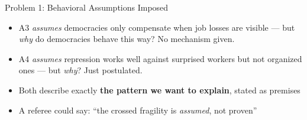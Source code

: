 \documentclass[
  ignorenonframetext,
  aspectratio=169]{beamer}
\begin{document}
\begin{frame}{Problem 1: Behavioral Assumptions Imposed}
\protect{}\label{problem-1-behavioral-assumptions-imposed}
\begin{center}
\end{center}

\vspace{0.4cm}

\begin{itemize}
  \item A3 \emph{assumes} democracies only compensate when job losses are visible --- but \emph{why} do democracies behave this way? No mechanism given.
  \item A4 \emph{assumes} repression works well against surprised workers but not organized ones --- but \emph{why}? Just postulated.
  \item Both describe exactly \textbf{the pattern we want to explain}, stated as premises
  \item A referee could say: ``the crossed fragility is \emph{assumed}, not proven''
\end{itemize}
\end{frame}
\end{document}
